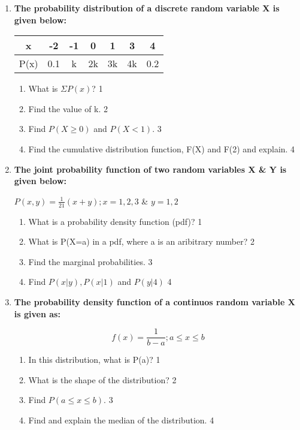 \documentclass[a4paper,oneside, margin=1.4in]{book}
\begin{document}
\begin{enumerate}
 \item
	  \textbf{The probability distribution of a discrete random variable X is given below:} 

	  \begin{table}[h]
	  \begin{center}
\begin{tabular}{c|cccccc}
x    & -2   & -1 & 0   & 1 & 3 & 4   \\ \hline
P(x) & 0.1 & k & 2k & 3k & 4k & 0.2
\end{tabular} 
\end{center}	
\end{table}
  
  \begin{enumerate}
    \item
	What is $\Sigma P(x)$? \hfill 1
    \item
	Find the value of k. \hfill 2
    \item  
	Find $P(X \geq 0)$ and $P(X < 1)$. \hfill 3
    \item
	Find the cumulative distribution function, F(X) and F(2) and explain. \hfill 4
  \end{enumerate}

 \item
	  \textbf{The joint probability function of two random variables X \& Y is given below:}

\begin{center}
$P(x,y) = \frac{1}{21}(x+y); x=1,2,3$ \& $y = 1,2$ 
\end{center}
  
  \begin{enumerate}
    \item
	What is a probability density function (pdf)? \hfill 1
    \item
	What is P(X=a) in a pdf, where a is an aribitrary number? \hfill 2
    \item  
	Find the marginal probabilities. \hfill 3
    \item
	Find $P(x \vert y), P(x \vert 1)$ and $P(y|4)$ \hfill 4
  \end{enumerate}
  
  \item
	  \textbf{The probability density function of a continuos random variable X is given as:}
	  
	  $$f(x) = \frac 1 {b-a}; a\le x\le b$$
  
  \begin{enumerate}
    \item
	In this distribution, what is P(a)? \hfill 1
    \item
    What is the shape of the distribution? \hfill 2	
    \item
	Find $P( a\le x\le b)$. \hfill 3
      \item
	Find and explain the median of the distribution. \hfill 4
  \end{enumerate}


\end{enumerate}
\end{document}
